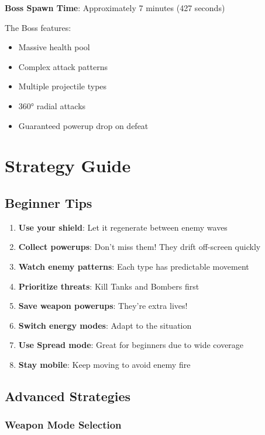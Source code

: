 \documentclass[11pt,a4paper]{article}
\begin{document}
\textbf{Boss Spawn Time}: Approximately 7 minutes (427 seconds)

The Boss features:
\begin{itemize}[nosep]
    \item Massive health pool
    \item Complex attack patterns
    \item Multiple projectile types
    \item 360° radial attacks
    \item Guaranteed powerup drop on defeat
\end{itemize}

\section{Strategy Guide}

\subsection{Beginner Tips}

\begin{enumerate}[leftmargin=*]
    \item \textbf{Use your shield}: Let it regenerate between enemy waves
    \item \textbf{Collect powerups}: Don't miss them! They drift off-screen quickly
    \item \textbf{Watch enemy patterns}: Each type has predictable movement
    \item \textbf{Prioritize threats}: Kill Tanks and Bombers first
    \item \textbf{Save weapon powerups}: They're extra lives!
    \item \textbf{Switch energy modes}: Adapt to the situation
    \item \textbf{Use Spread mode}: Great for beginners due to wide coverage
    \item \textbf{Stay mobile}: Keep moving to avoid enemy fire
\end{enumerate}

\subsection{Advanced Strategies}

\subsubsection{Weapon Mode Selection}
\end{document}
